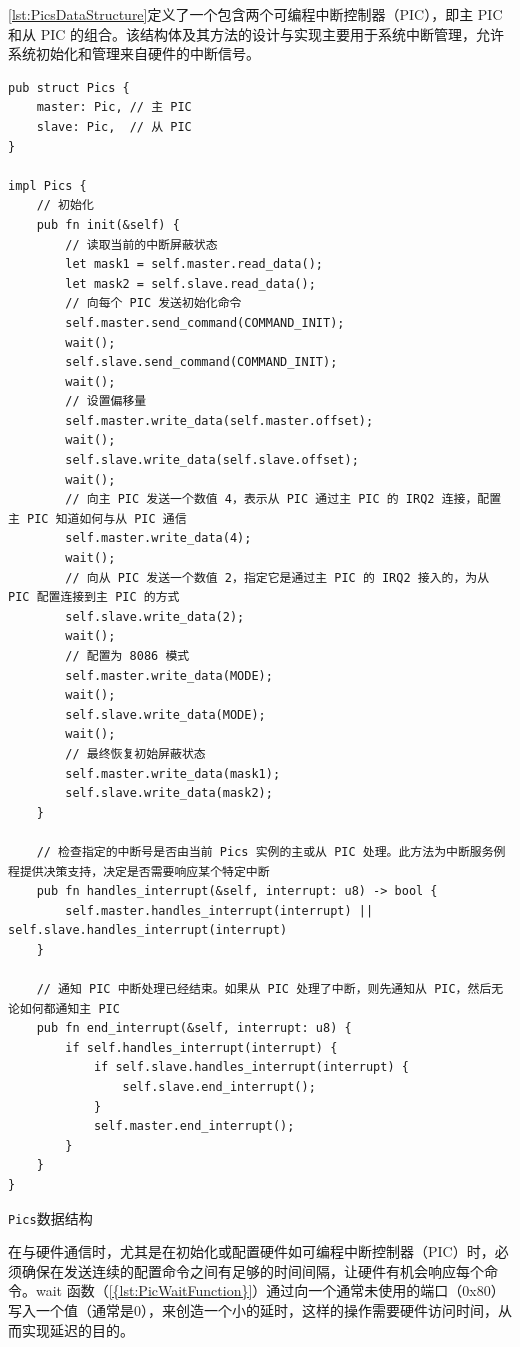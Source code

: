 \cref{lst:PicsDataStructure}定义了一个包含两个可编程中断控制器（PIC），即主 PIC 和从 PIC 的组合。该结构体及其方法的设计与实现主要用于系统中断管理，允许系统初始化和管理来自硬件的中断信号。

\begin{listing}[htbp]
    \begin{verbatim}
pub struct Pics {
    master: Pic, // 主 PIC
    slave: Pic,  // 从 PIC
}

impl Pics {
    // 初始化
    pub fn init(&self) {
        // 读取当前的中断屏蔽状态
        let mask1 = self.master.read_data();
        let mask2 = self.slave.read_data();
        // 向每个 PIC 发送初始化命令
        self.master.send_command(COMMAND_INIT);
        wait();
        self.slave.send_command(COMMAND_INIT);
        wait();
        // 设置偏移量
        self.master.write_data(self.master.offset);
        wait();
        self.slave.write_data(self.slave.offset);
        wait();
        // 向主 PIC 发送一个数值 4，表示从 PIC 通过主 PIC 的 IRQ2 连接，配置主 PIC 知道如何与从 PIC 通信
        self.master.write_data(4);
        wait();
        // 向从 PIC 发送一个数值 2，指定它是通过主 PIC 的 IRQ2 接入的，为从 PIC 配置连接到主 PIC 的方式
        self.slave.write_data(2);
        wait();
        // 配置为 8086 模式
        self.master.write_data(MODE);
        wait();
        self.slave.write_data(MODE);
        wait();
        // 最终恢复初始屏蔽状态
        self.master.write_data(mask1);
        self.slave.write_data(mask2);
    }

    // 检查指定的中断号是否由当前 Pics 实例的主或从 PIC 处理。此方法为中断服务例程提供决策支持，决定是否需要响应某个特定中断
    pub fn handles_interrupt(&self, interrupt: u8) -> bool {
        self.master.handles_interrupt(interrupt) || self.slave.handles_interrupt(interrupt)
    }

    // 通知 PIC 中断处理已经结束。如果从 PIC 处理了中断，则先通知从 PIC，然后无论如何都通知主 PIC
    pub fn end_interrupt(&self, interrupt: u8) {
        if self.handles_interrupt(interrupt) {
            if self.slave.handles_interrupt(interrupt) {
                self.slave.end_interrupt();
            }
            self.master.end_interrupt();
        }
    }
}
    \end{verbatim}
    \caption{\texttt{Pics}数据结构}\label{lst:PicsDataStructure}
\end{listing}

在与硬件通信时，尤其是在初始化或配置硬件如可编程中断控制器（PIC）时，必须确保在发送连续的配置命令之间有足够的时间间隔，让硬件有机会响应每个命令。wait 函数（\cref{{lst:PicWaitFunction}}）通过向一个通常未使用的端口（0x80）写入一个值（通常是0），来创造一个小的延时，这样的操作需要硬件访问时间，从而实现延迟的目的。

